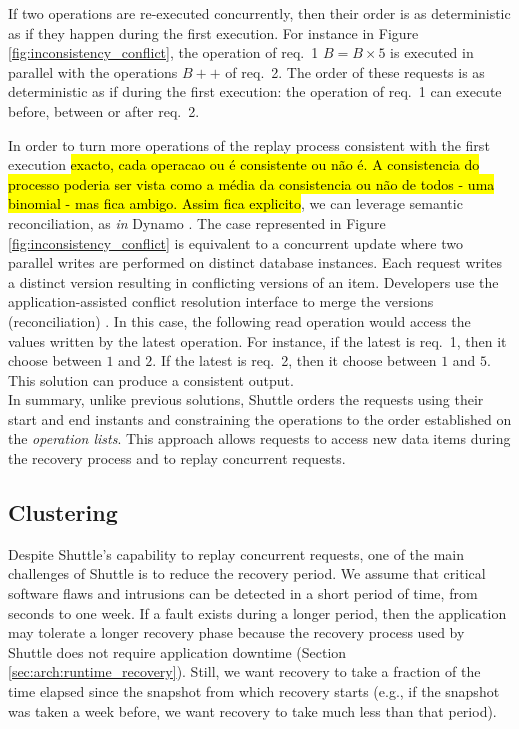 If two operations are re-executed concurrently, then their order is as deterministic as if they happen during the first execution. For instance in Figure \ref{fig:inconsistency_conflict}, the operation of {req.~1} $B = B \times 5$ is executed in parallel with the operations $B++$ of {req.~2}. The order of these requests is as deterministic as if during the first execution: the operation of {req.~1} can execute before, between or after {req.~2}.


In order to turn more operations of the replay process consistent with the first execution \hl{exacto, cada operacao ou é consistente ou não é. A consistencia do processo poderia ser vista como a média da consistencia ou não de todos - uma binomial - mas fica ambigo. Assim fica explicito}, we can leverage semantic reconciliation, as \textit{in} Dynamo \cite{Decandia2007}. The case represented in Figure \ref{fig:inconsistency_conflict} is equivalent to a concurrent update where two parallel writes are performed on distinct database instances. Each request writes a distinct version resulting in conflicting versions of an item. Developers use the application-assisted conflict resolution interface to merge the versions (reconciliation) \cite{Decandia2007}. In this case, the following read operation would access the values written by the latest operation. For instance, if the latest is {req.~1}, then it choose between $1$ and $2$. If the latest is {req.~2}, then it choose between $1$ and $5$. This solution can produce a consistent output.\\

In summary, unlike previous solutions, Shuttle orders the requests using their start and end instants and constraining the operations to the order established on the \textit{operation lists}. This approach allows requests to access new data items during the recovery process and to replay concurrent requests.





\subsection{Clustering}
\label{sec:arch:clustering}

Despite Shuttle's capability to replay concurrent requests, one of the main challenges of Shuttle is to reduce the recovery period. We assume that critical software flaws and intrusions can be detected in a short period of time, from seconds to one week. If a fault exists during a longer period, then the application may tolerate a longer recovery phase because the recovery process used by Shuttle does not require application downtime (Section \ref{sec:arch:runtime_recovery}). Still, we want recovery to take a fraction of the time elapsed since the snapshot from which recovery starts (e.g., if the snapshot was taken a week before, we want recovery to take much less than that period).  

